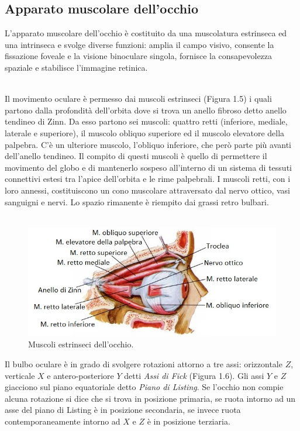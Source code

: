 \subsection{Apparato muscolare dell'occhio}

L’apparato muscolare dell'occhio è costituito da una muscolatura estrinseca ed una intrinseca e svolge diverse funzioni: amplia il campo visivo, consente la fissazione foveale e la visione binoculare singola, fornisce la consapevolezza spaziale e stabilisce l'immagine retinica.
\\\
 
Il movimento oculare è permesso dai muscoli estrinseci (Figura 1.5) i quali partono dalla profondità dell’orbita dove si trova un anello fibroso detto anello tendineo di Zinn. Da esso partono sei muscoli: quattro retti (inferiore, mediale, laterale e superiore), il muscolo obliquo superiore ed il muscolo elevatore della palpebra. C’è un ulteriore muscolo, l’obliquo inferiore, che però parte più avanti dell’anello tendineo. Il compito di questi muscoli è quello di permettere il movimento del globo e di mantenerlo sospeso all’interno di un sistema di tessuti connettivi estesi tra l’apice dell’orbita e le rime palpebrali. I muscoli retti, con i loro annessi, costituiscono un cono muscolare attraversato dal nervo ottico, vasi sanguigni e nervi. Lo spazio rimanente è riempito dai grassi retro bulbari. 
\\\
\begin{figure}[h!]
	\centering
	\includegraphics[scale=2.7]{source/immagini/muscoli_estrinseci_occhio.jpg}
	\caption[Muscoli estrinseci dell'occhio]{Muscoli estrinseci dell'occhio.}
	\label{fig:test6}
\end{figure}

Il bulbo oculare è in grado di svolgere rotazioni attorno a tre assi: orizzontale $Z$, verticale $X$ e antero-posteriore $Y$ detti \emph{Assi di Fick} (Figura 1.6). Gli assi $Y$ e $Z$ giacciono sul piano equatoriale detto \emph{Piano di Listing}. Se l’occhio non compie alcuna rotazione si dice che si trova in posizione primaria, se ruota intorno ad un asse del piano di Listing  è in posizione secondaria, se invece ruota contemporaneamente intorno ad $X$ e $Z$ è in posizione terziaria.

